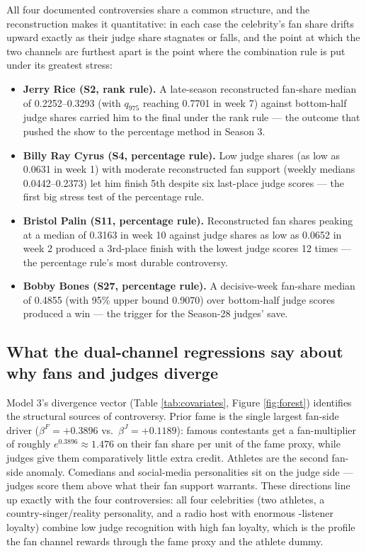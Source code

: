 All four documented controversies share a common structure, and the reconstruction
makes it quantitative: in each case the celebrity's fan share drifts upward exactly as
their judge share stagnates or falls, and the point at which the two channels are
furthest apart is the point where the combination rule is put under its greatest
stress:
\begin{itemize}
\item \textbf{Jerry Rice (S2, rank rule).} A late-season reconstructed fan-share
median of 0.2252--0.3293 (with $q_{975}$ reaching 0.7701 in week 7) against bottom-half
judge shares carried him to the final under the rank rule --- the outcome that pushed
the show to the percentage method in Season 3.
\item \textbf{Billy Ray Cyrus (S4, percentage rule).} Low judge shares (as low as
0.0631 in week 1) with moderate reconstructed fan support (weekly medians
0.0442--0.2373) let him finish 5th despite six last-place judge scores --- the first
big stress test of the percentage rule.
\item \textbf{Bristol Palin (S11, percentage rule).} Reconstructed fan shares
peaking at a median of 0.3163 in week 10 against judge shares as low as 0.0652 in
week 2 produced a 3rd-place finish with the lowest judge scores 12 times --- the
percentage rule's most durable controversy.
\item \textbf{Bobby Bones (S27, percentage rule).} A decisive-week fan-share median
of 0.4855 (with 95\% upper bound 0.9070) over bottom-half judge scores produced a
win --- the trigger for the Season-28 judges' save.
\end{itemize}

\subsection{What the dual-channel regressions say about why fans and judges diverge}

Model 3's divergence vector (Table \ref{tab:covariates}, Figure \ref{fig:forest})
identifies the structural sources of controversy. Prior fame is the single largest
fan-side driver ($\beta^F = +0.3896$ vs.\ $\beta^J = +0.1189$): famous contestants get
a fan-multiplier of roughly $e^{0.3896} \approx 1.476$ on their fan share per unit of
the fame proxy, while judges give them comparatively little extra credit. Athletes are
the second fan-side anomaly. Comedians and social-media personalities sit on the judge
side --- judges score them above what their fan support warrants. These directions
line up exactly with the four controversies: all four celebrities (two athletes, a
country-singer/reality personality, and a radio host with enormous -listener loyalty)
combine low judge recognition with high fan loyalty, which is the profile the fan
channel rewards through the fame proxy and the athlete dummy.


